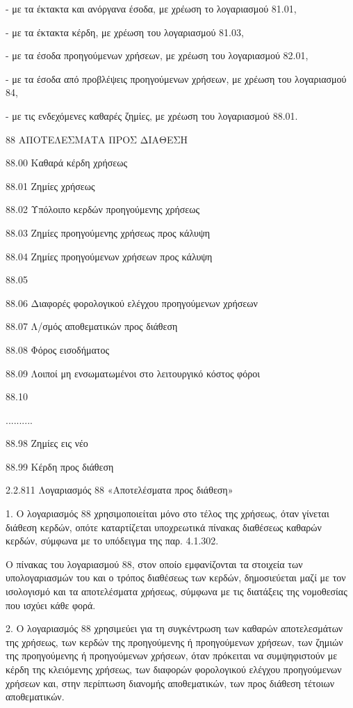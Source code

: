 \documentclass[A4,10pt,greek]{book}
\begin{document}
- με τα έκτακτα και ανόργανα έσοδα, με χρέωση το λογαριασμού 81.01,

- με τα έκτακτα κέρδη, με χρέωση του λογαριασμού 81.03,

- με τα έσοδα προηγούμενων χρήσεων, με χρέωση του λογαριασμού 82.01,

- με τα έσοδα από προβλέψεις προηγούμενων χρήσεων, με χρέωση του λογαριασμού 84,

- με τις ενδεχόμενες καθαρές ζημίες, με χρέωση του λογαριασμού 88.01.

 88    ΑΠΟΤΕΛΕΣΜΑΤΑ ΠΡΟΣ ΔΙΑΘΕΣΗ

        88.00    Καθαρά κέρδη χρήσεως

        88.01    Ζημίες χρήσεως

        88.02    Υπόλοιπο κερδών προηγούμενης χρήσεως

        88.03    Ζημίες προηγούμενης χρήσεως προς κάλυψη

        88.04    Ζημίες προηγούμενων χρήσεων προς κάλυψη

        88.05

        88.06    Διαφορές φορολογικού ελέγχου προηγούμενων χρήσεων

        88.07    Λ/σμός αποθεματικών προς διάθεση

        88.08    Φόρος εισοδήματος

        88.09    Λοιποί μη ενσωματωμένοι στο λειτουργικό κόστος φόροι

        88.10

        ..........

        88.98    Ζημίες εις νέο

        88.99    Κέρδη προς διάθεση

2.2.811 Λογαριασμός 88 «Αποτελέσματα προς διάθεση»

1. Ο λογαριασμός 88 χρησιμοποιείται μόνο στο τέλος της χρήσεως, όταν γίνεται διάθεση κερδών, οπότε καταρτίζεται υποχρεωτικά πίνακας διαθέσεως καθαρών κερδών, σύμφωνα με το υπόδειγμα της παρ. 4.1.302.

Ο πίνακας του λογαριασμού 88, στον οποίο εμφανίζονται τα στοιχεία των υπολογαριασμών του και ο τρόπος διαθέσεως των κερδών, δημοσιεύεται μαζί με τον ισολογισμό και τα αποτελέσματα χρήσεως, σύμφωνα με τις διατάξεις της νομοθεσίας που ισχύει κάθε φορά.

2. Ο λογαριασμός 88 χρησιμεύει για τη συγκέντρωση των καθαρών αποτελεσμάτων της χρήσεως, των κερδών της προηγούμενης ή προηγούμενων χρήσεων, των ζημιών της προηγούμενης ή προηγούμενων χρήσεων, όταν πρόκειται να συμψηφιστούν με κέρδη της κλειόμενης χρήσεως, των διαφορών φορολογικού ελέγχου προηγούμενων χρήσεων και, στην περίπτωση διανομής αποθεματικών, των προς διάθεση τέτοιων αποθεματικών.
\end{document}
